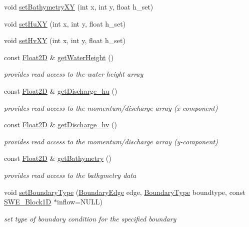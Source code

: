 \begin{DoxyCompactItemize}
void \hyperlink{classSWE__Block_ab07678606e4d6e0331d91c014b4c0ad5}{set\+Bathymetry\+XY} (int x, int y, float h\+\_\+set)
\item 
void \hyperlink{classSWE__Block_ae9e24854137790c1e773ce7e08c8ccc9}{set\+Hu\+XY} (int x, int y, float h\+\_\+set)
\item 
void \hyperlink{classSWE__Block_a65153d7aeea996cc42045d28b0d05b5f}{set\+Hv\+XY} (int x, int y, float h\+\_\+set)
\item 
const \hyperlink{classFloat2D}{Float2D} \& \hyperlink{classSWE__Block_ab1aea4294403c194180c3dc107339fd7}{get\+Water\+Height} ()
\begin{DoxyCompactList}\small\item\em provides read access to the water height array \end{DoxyCompactList}\item 
const \hyperlink{classFloat2D}{Float2D} \& \hyperlink{classSWE__Block_ae5e766626a1e3fee89625610e2c67f1f}{get\+Discharge\+\_\+hu} ()
\begin{DoxyCompactList}\small\item\em provides read access to the momentum/discharge array (x-\/component) \end{DoxyCompactList}\item 
const \hyperlink{classFloat2D}{Float2D} \& \hyperlink{classSWE__Block_aece9e8dc3f9b8ab27420e537c76daf7c}{get\+Discharge\+\_\+hv} ()
\begin{DoxyCompactList}\small\item\em provides read access to the momentum/discharge array (y-\/component) \end{DoxyCompactList}\item 
const \hyperlink{classFloat2D}{Float2D} \& \hyperlink{classSWE__Block_a98e2c99a335d11d09a1489d6873b5615}{get\+Bathymetry} ()
\begin{DoxyCompactList}\small\item\em provides read access to the bathymetry data \end{DoxyCompactList}\item 
void \hyperlink{classSWE__Block_aa220b93e43b10f56c72a44d7363645c1}{set\+Boundary\+Type} (\hyperlink{scenarios_2SWE__Scenario_8hh_aa5e01e3f7df312f7b9b0d02521141fcc}{Boundary\+Edge} edge, \hyperlink{scenarios_2SWE__Scenario_8hh_af75d5dd7322fa39ed0af4e7839e600f8}{Boundary\+Type} boundtype, const \hyperlink{structSWE__Block1D}{S\+W\+E\+\_\+\+Block1D} $\ast$inflow=N\+U\+LL)
\begin{DoxyCompactList}\small\item\em set type of boundary condition for the specified boundary \end{DoxyCompactList}\item 

\end{DoxyCompactItemize}
